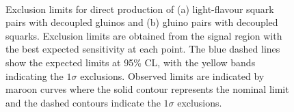 \begin{figure}[tbp]
\begin{center}
\\
\end{center}
\caption{Exclusion limits for direct production of (a) light-flavour squark pairs with decoupled gluinos and (b) gluino pairs with decoupled squarks.
Exclusion limits are obtained from the signal region with the best expected sensitivity at each point.
The blue dashed lines show the expected limits at 95\% CL, with the yellow bands indicating the $1\sigma$ exclusions.
Observed limits are indicated by maroon curves where the solid contour represents the nominal limit and the dashed contours indicate the $1\sigma$ exclusions.
}
\label{fig:sensitivitytext}
\end{figure}
